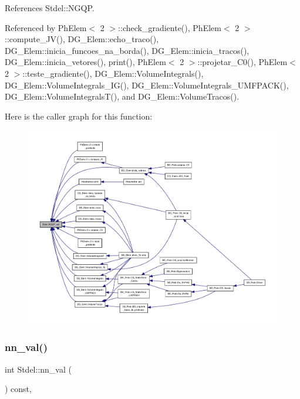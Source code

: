 References Stdel\+::\+N\+G\+QP.



Referenced by Ph\+Elem$<$ 2 $>$\+::check\+\_\+gradiente(), Ph\+Elem$<$ 2 $>$\+::compute\+\_\+\+J\+V(), D\+G\+\_\+\+Elem\+::echo\+\_\+traco(), D\+G\+\_\+\+Elem\+::inicia\+\_\+funcoes\+\_\+na\+\_\+borda(), D\+G\+\_\+\+Elem\+::inicia\+\_\+tracos(), D\+G\+\_\+\+Elem\+::inicia\+\_\+vetores(), print(), Ph\+Elem$<$ 2 $>$\+::projetar\+\_\+\+C0(), Ph\+Elem$<$ 2 $>$\+::teste\+\_\+gradiente(), D\+G\+\_\+\+Elem\+::\+Volume\+Integrals(), D\+G\+\_\+\+Elem\+::\+Volume\+Integrals\+\_\+\+I\+G(), D\+G\+\_\+\+Elem\+::\+Volume\+Integrals\+\_\+\+U\+M\+F\+P\+A\+C\+K(), D\+G\+\_\+\+Elem\+::\+Volume\+Integrals\+T(), and D\+G\+\_\+\+Elem\+::\+Volume\+Tracos().

Here is the caller graph for this function\+:
\nopagebreak
\begin{figure}[H]
\begin{center}
\leavevmode
\includegraphics[width=350pt]{classStdel_a2f964819235e0a55fd60733518b592f2_icgraph}
\end{center}
\end{figure}
\mbox{\label{classStdel_a6086dceed8fe3dd410da0d6b84f02377}} 
\subsubsection{\texorpdfstring{nn\+\_\+val()}{nn\_val()}}
{\footnotesize\ttfamily int Stdel\+::nn\+\_\+val (\begin{DoxyParamCaption}{ }\end{DoxyParamCaption}) const\hspace{0.3cm}{\ttfamily [inline]}, {\ttfamily [inherited]}}



